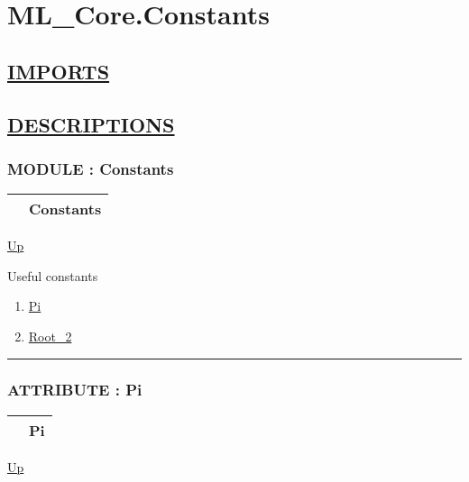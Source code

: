 \chapter*{ML\_Core.Constants}
\hypertarget{ecldoc:toc:ML_Core.Constants}{}

\section*{\underline{IMPORTS}}

\section*{\underline{DESCRIPTIONS}}
\subsection*{MODULE : Constants}
\hypertarget{ecldoc:ML_Core.Constants}{}

{\renewcommand{\arraystretch}{1.5}
\begin{tabularx}{\textwidth}{|>{\raggedright\arraybackslash}l|X|}
\hline
\hspace{0pt} & Constants \\
\hline
\end{tabularx}
}

\hyperlink{ecldoc:toc:ML_Core}{Up}

\par
Useful constants


\begin{enumerate}
\item \hyperlink{ecldoc:ml_core.constants.pi}{Pi}
\item \hyperlink{ecldoc:ml_core.constants.root_2}{Root\_2}
\end{enumerate}

\rule{\textwidth}{0.4pt}

\subsection*{ATTRIBUTE : Pi}
\hypertarget{ecldoc:ml_core.constants.pi}{}

{\renewcommand{\arraystretch}{1.5}
\begin{tabularx}{\textwidth}{|>{\raggedright\arraybackslash}l|X|}
\hline
\hspace{0pt} & Pi \\
\hline
\end{tabularx}
}

\hyperlink{ecldoc:ML_Core.Constants}{Up}

